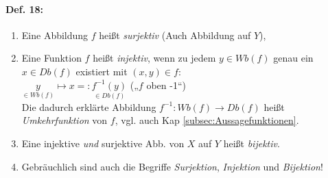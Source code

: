 \paragraph{Def. 18:}
\begin{enumerate} [label=\alph*)]
\item Eine Abbildung $f$ heißt \emph{surjektiv} (Auch Abbildung auf $Y$), 
\item Eine Funktion $f$ heißt \emph{injektiv}, wenn zu jedem $y \in Wb(f)$ genau ein $x \in Db(f)$ existiert mit $(x,y) \in f$:\\
$\underset{\in Wb(f)}{y} \longmapsto x =:\underset{\in Db(f)} {f^{-1}(y)}$ \tab („$f$ oben -1“)\\
Die dadurch erklärte Abbildung $f^{-1}: Wb(f) \rightarrow Db (f)$ heißt \emph{Umkehrfunktion} von $f$, vgl. auch Kap \ref{subsec:Aussagefunktionen}.
\item Eine injektive \emph{und} surjektive Abb. von $X$ auf $Y$ heißt \emph{bijektiv}.
\item Gebräuchlich sind auch die Begriffe \emph{Surjektion}, \emph{Injektion} und \emph{Bijektion}!
\end{enumerate}

